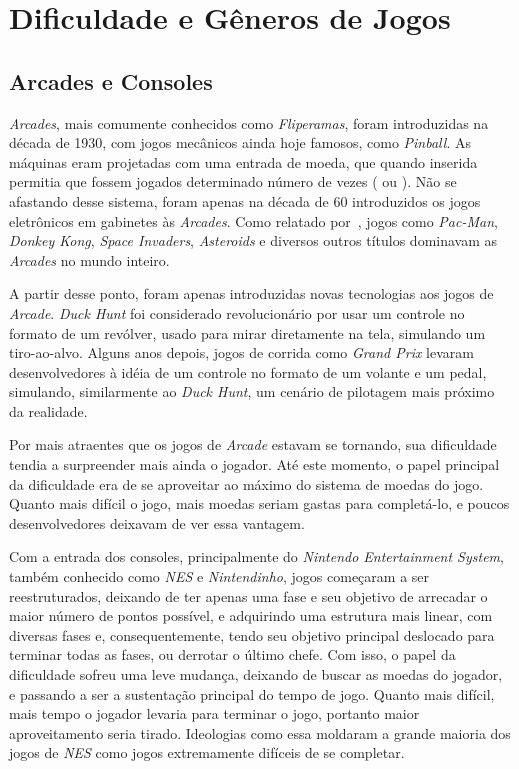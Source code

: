 
\chapter{Dificuldade e Gêneros de Jogos}
\label{cap:dificuldade e generos de jogos}
\section{Arcades e Consoles}

\textit{Arcades}, mais comumente conhecidos como \textit{Fliperamas}, foram introduzidas na década de 1930, com jogos mecânicos ainda hoje famosos, como \textit{Pinball}. As máquinas eram projetadas com uma entrada de moeda, que quando inserida permitia que fossem jogados determinado número de vezes (\textquotedbl{} ou \textquotedbl{}). Não se afastando desse sistema, foram apenas na década de 60 introduzidos os jogos eletrônicos em gabinetes às \textit{Arcades}. Como relatado por~\citet{ArcadeGaming}, jogos como \textit{Pac-Man}, \textit{Donkey Kong}, \textit{Space Invaders}, \textit{Asteroids} e diversos outros títulos dominavam as \textit{Arcades} no mundo inteiro.

A partir desse ponto, foram apenas introduzidas novas tecnologias aos jogos de \textit{Arcade}. \textit{Duck Hunt} foi considerado revolucionário por usar um controle no formato  de um revólver, usado para mirar diretamente na tela, simulando um tiro-ao-alvo. Alguns anos depois, jogos de corrida como \textit{Grand Prix} levaram desenvolvedores à idéia de um controle no formato de um volante e um pedal, simulando, similarmente ao \textit{Duck Hunt}, um cenário de pilotagem mais próximo da realidade.

Por mais atraentes que os jogos de \textit{Arcade} estavam se tornando, sua dificuldade tendia a surpreender mais ainda o jogador. Até este momento, o papel principal da dificuldade era de se aproveitar ao máximo do sistema de moedas do jogo. Quanto mais difícil o jogo, mais moedas seriam gastas para completá-lo, e poucos desenvolvedores deixavam de ver essa vantagem.

Com a entrada dos consoles, principalmente do \textit{Nintendo Entertainment System}, também conhecido como \textit{NES} e \textit{Nintendinho}, jogos começaram a ser reestruturados, deixando de ter apenas uma fase e seu objetivo de arrecadar o maior número de pontos possível, e adquirindo uma estrutura mais linear, com diversas fases e, consequentemente, tendo seu objetivo principal deslocado para terminar todas as fases, ou derrotar o último chefe. Com isso, o papel da dificuldade sofreu uma leve mudança, deixando de buscar as moedas do jogador, e passando a ser a sustentação principal do tempo de jogo. Quanto mais difícil, mais tempo o jogador levaria para terminar o jogo, portanto maior aproveitamento seria tirado. Ideologias como essa moldaram a grande maioria dos jogos de \textit{NES} como jogos extremamente difíceis de se completar.

